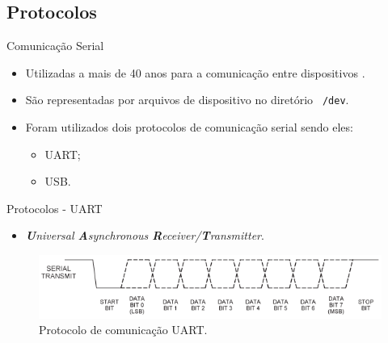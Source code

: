 	\subsection{Protocolos}
	\begin{frame}{Comunicação Serial}
		\begin{itemize}
			\setlength\itemsep{2.2em}
			\item Utilizadas a mais de 40 anos para a comunicação entre dispositivos \cite{nemeth2004manual}.
			\item São representadas por arquivos de dispositivo no diretório \texttt{ /dev}.
			\item Foram utilizados dois protocolos de comunicação serial sendo eles:
			\begin{itemize}
				\setlength\itemsep{1em}
				\item UART;
				\item USB.
			\end{itemize}
		\end{itemize}
	\end{frame}
	\begin{frame}{Protocolos - UART}
		\begin{itemize}
			\item \textit{\textbf{U}niversal \textbf{A}synchronous \textbf{R}eceiver/\textbf{T}ransmitter}.
		\end{itemize}
		\bigskip
		\begin{figure}[p]
			\centering
			\includegraphics[width=1\textwidth]{img/fpga/uart.png}
			\caption{Protocolo de comunicação UART.}
			\label{fig:uart}
		\end{figure}
	\end{frame}
